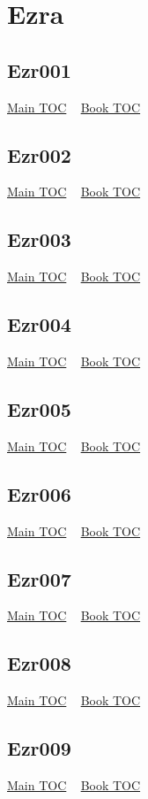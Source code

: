 \documentclass{book}
\begin{document}
  \chapter{Ezra} \label{subsec:Ezr} \begin{multicols}{2} \minitoc \end{multicols}
  \section{Ezr001}\hyperlink{toc}{Main TOC} ~ \hyperref[subsec:Ezr]{Book TOC} 
  \section{Ezr002}\hyperlink{toc}{Main TOC} ~ \hyperref[subsec:Ezr]{Book TOC} 
  \section{Ezr003}\hyperlink{toc}{Main TOC} ~ \hyperref[subsec:Ezr]{Book TOC} 
  \section{Ezr004}\hyperlink{toc}{Main TOC} ~ \hyperref[subsec:Ezr]{Book TOC} 
  \section{Ezr005}\hyperlink{toc}{Main TOC} ~ \hyperref[subsec:Ezr]{Book TOC} 
  \section{Ezr006}\hyperlink{toc}{Main TOC} ~ \hyperref[subsec:Ezr]{Book TOC} 
  \section{Ezr007}\hyperlink{toc}{Main TOC} ~ \hyperref[subsec:Ezr]{Book TOC} 
  \section{Ezr008}\hyperlink{toc}{Main TOC} ~ \hyperref[subsec:Ezr]{Book TOC} 
  \section{Ezr009}\hyperlink{toc}{Main TOC} ~ \hyperref[subsec:Ezr]{Book TOC} 
\end{document}
